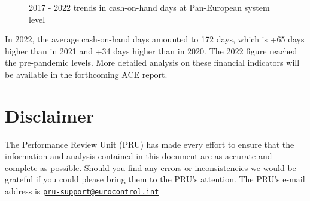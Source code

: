 \documentclass[
  letterpaper,
  DIV=11,
  numbers=noendperiod]{scrreprt}
\begin{document}
\newpage{}

\begin{figure}


\caption{\label{fig-figure-5-2}2017 - 2022 trends in cash-on-hand days
at Pan-European system level}

\end{figure}%

In 2022, the average cash-on-hand days amounted to 172 days, which is
+65 days higher than in 2021 and +34 days higher than in 2020. The 2022
figure reached the pre-pandemic levels. More detailed analysis on these
financial indicators will be available in the forthcoming ACE report.


\chapter*{Disclaimer}\label{disclaimer}


\begin{tcolorbox}[enhanced jigsaw, leftrule=.75mm, breakable, left=2mm, colframe=quarto-callout-note-color-frame, rightrule=.15mm, colback=white, opacityback=0, arc=.35mm, toprule=.15mm, bottomrule=.15mm]

The Performance Review Unit (PRU) has made every effort to ensure that
the information and analysis contained in this document are as accurate
and complete as possible. Should you find any errors or inconsistencies
we would be grateful if you could please bring them to the PRU's
attention. The PRU's e-mail address is
\href{mailto:pru-support@eurocontrol.int}{\nolinkurl{pru-support@eurocontrol.int}}

\end{tcolorbox}
\end{document}
